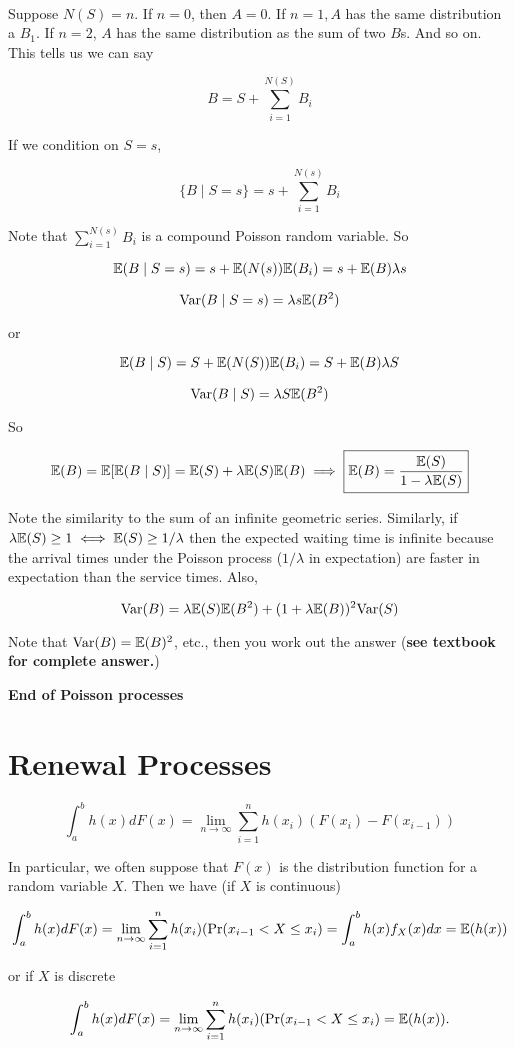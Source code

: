 \

Suppose \(N(S) = n\). If \(n=0\), then \(A = 0\). If \(n=1, A\) has the same distribution a \(B_1\). If \(n=2\), \(A\) has the same distribution as the sum of two \(B\)s. And so on. This tells us we can say

\[
B = S + \sum_{i=1}^{N(S)} B_i
\]

If we condition on \(S=s\),

\[
\{B \mid S =s\} = s + \sum_{i=1}^{N(s)} B_i
\]

Note that \( \sum_{i=1}^{N(s)} B_i\) is a compound Poisson random variable. So

\[
\mathbb{E}(B \mid S =s) = s +\mathbb{E}(N(s)) \mathbb{E}( B_i) = s + \mathbb{E}(B) \lambda s
\]

\[
\mathrm{Var}(B \mid S=s) = \lambda s \mathbb{E}(B^2)
\]

or

\[
\mathbb{E}(B \mid S) = S +\mathbb{E}(N(S)) \mathbb{E}( B_i) = S + \mathbb{E}(B) \lambda S
\]

\[
\mathrm{Var}(B \mid S) = \lambda S \mathbb{E}(B^2)
\]

So

\[
\mathbb{E}(B) = \mathbb{E}[\mathbb{E}(B \mid S)] = \mathbb{E}(S) + \lambda \mathbb{E}(S) \mathbb{E}(B) \implies \boxed{\mathbb{E}(B) = \frac{\mathbb{E}(S)}{1 - \lambda \mathbb{E}(S)}}
\]

Note the similarity to the sum of an infinite geometric series. Similarly, if \(\lambda \mathbb{E}(S) \geq 1 \iff \mathbb{E}(S) \geq 1/\lambda\) then the expected waiting time is infinite because the arrival times under the Poisson process (\(1/\lambda\) in expectation) are faster in expectation than the service times. Also,

\[
\mathrm{Var}(B) = \lambda \mathbb{E}(S) \mathbb{E}(B^2) + (1 + \lambda \mathbb{E}(B))^2 \mathrm{Var}(S)
\]

Note that \(\mathrm{Var}(B) = \mathbb{E}(B)^2\), etc., then you work out the answer (\textbf{see textbook for complete answer.})

\textbf{End of Poisson processes}

\section{Renewal Processes}

\begin{definition}

\[
\int_a^b h(x) dF(x) = \lim_{n \to \infty} \sum_{i=1}^n h(x_i)( F(x_i ) - F(x_{i-1}))
\]

In particular, we often suppose that \(F(x)\) is the distribution function for a random variable \(X\). Then we have (if \(X\) is continuous)

\[
\int_a^b h(x) dF(x) = \lim_{n \to \infty} \sum_{i=1}^n h(x_i)( \Pr(x_{i-1}< X \leq x_i) = \int_a^b h(x) f_X(x) dx = \mathbb{E}(h(x))
\]

or if \(X\) is discrete

\[
\int_a^b h(x) dF(x) = \lim_{n \to \infty} \sum_{i=1}^n h(x_i)( \Pr(x_{i-1}< X \leq x_i) = \mathbb{E}(h(x)).
\]


\end{definition}

